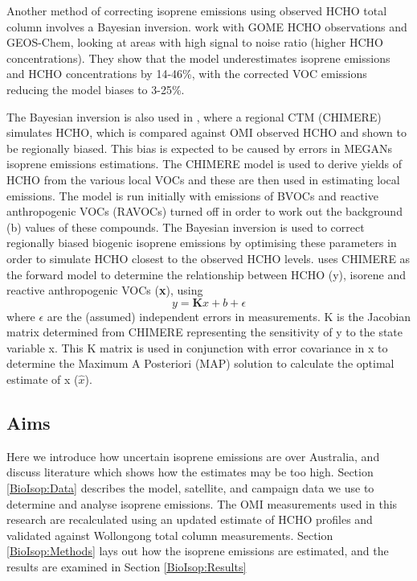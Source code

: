      Another method of correcting isoprene emissions using observed HCHO total column involves a Bayesian inversion.
      \textcite{Shim2005} work with GOME HCHO observations and GEOS-Chem, looking at areas with high signal to noise ratio (higher HCHO concentrations).
      They show that the model underestimates isoprene emissions and HCHO concentrations by 14-46\%, with the corrected VOC emissions reducing the model biases to 3-25\%.
      
      The Bayesian inversion is also used in \textcite{Curci2010}, where a regional CTM (CHIMERE) simulates HCHO, which is compared against OMI observed HCHO and shown to be regionally biased.
      This bias is expected to be caused by errors in MEGANs isoprene emissions estimations.
      The CHIMERE model is used to derive yields of HCHO from the various local VOCs and these are then used in estimating local emissions.
      The model is run initially with emissions of BVOCs and reactive anthropogenic VOCs (RAVOCs) turned off in order to work out the background (b) values of these compounds.
      The Bayesian inversion is used to correct regionally biased biogenic isoprene emissions by optimising these parameters in order to simulate HCHO closest to the observed HCHO levels.
      \textcite{Curci2010} uses CHIMERE as the forward model to determine the relationship between HCHO (y), isorene and reactive anthropogenic VOCs (\textbf{x}), using 
      \begin{equation}
      y=\mathbf{K}x + b + \epsilon
      \end{equation}
      where $\epsilon$ are the (assumed) independent errors in measurements.
      K is the Jacobian matrix determined from CHIMERE representing the sensitivity of y to the state variable x.
      This K matrix is used in conjunction with error covariance in x to determine the Maximum A Posteriori (MAP) solution to calculate the optimal estimate of x ($\hat{x}$).
  
  
  \subsection{Aims}
    
    Here we introduce how uncertain isoprene emissions are over Australia, and discuss literature which shows how the estimates may be too high.
    Section \ref{BioIsop:Data} describes the model, satellite, and campaign data we use to determine and analyse isoprene emissions.
    The OMI measurements used in this research are recalculated using an updated estimate of HCHO profiles and validated against Wollongong total column measurements.
    Section \ref{BioIsop:Methods} lays out how the isoprene emissions are estimated, and the results are examined in Section \ref{BioIsop:Results}
    
